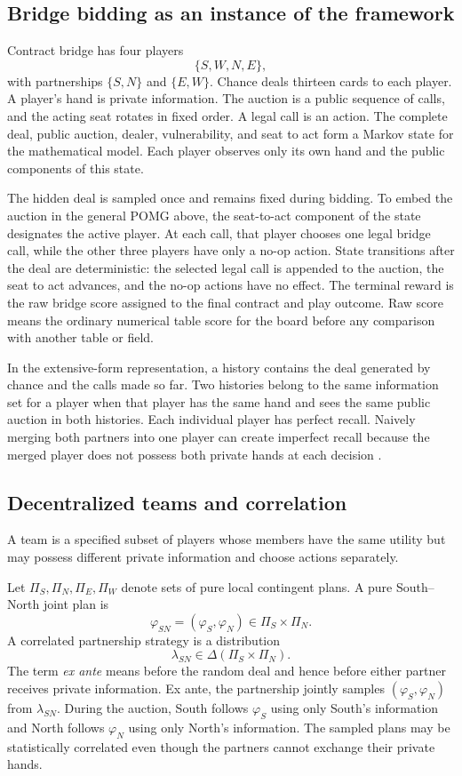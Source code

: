 \subsection{Bridge bidding as an instance of the framework}

Contract bridge has four players
\[
    \{S,W,N,E\},
\]
with partnerships $\{S,N\}$ and $\{E,W\}$. Chance deals thirteen cards to each player. A player's hand is private information. The auction is a public sequence of calls, and the acting seat rotates in fixed order. A legal call is an action. The complete deal, public auction, dealer, vulnerability, and seat to act form a Markov state for the mathematical model. Each player observes only its own hand and the public components of this state.

The hidden deal is sampled once and remains fixed during bidding. To embed the auction in the general POMG above, the seat-to-act component of the state designates the active player. At each call, that player chooses one legal bridge call, while the other three players have only a no-op action. State transitions after the deal are deterministic: the selected legal call is appended to the auction, the seat to act advances, and the no-op actions have no effect. The terminal reward is the raw bridge score assigned to the final contract and play outcome. Raw score means the ordinary numerical table score for the board before any comparison with another table or field.

In the extensive-form representation, a history contains the deal generated by chance and the calls made so far. Two histories belong to the same information set for a player when that player has the same hand and sees the same public auction in both histories. Each individual player has perfect recall. Naively merging both partners into one player can create imperfect recall because the merged player does not possess both private hands at each decision \cite{gimbert2020bridge}.


\subsection{Decentralized teams and correlation}
\label{app:decentralized-teams}

A team is a specified subset of players whose members have the same utility but may possess different private information and choose actions separately.

Let $\Pi_S,\Pi_N,\Pi_E,\Pi_W$ denote sets of pure local contingent plans. A pure South--North joint plan is
\[
    \varphi_{SN}=(\varphi_S,\varphi_N)\in\Pi_S\times\Pi_N.
\]
A correlated partnership strategy is a distribution
\[
    \lambda_{SN}\in\Delta(\Pi_S\times\Pi_N).
\]
The term \emph{ex ante} means before the random deal and hence before either partner receives private information. Ex ante, the partnership jointly samples $(\varphi_S,\varphi_N)$ from $\lambda_{SN}$. During the auction, South follows $\varphi_S$ using only South's information and North follows $\varphi_N$ using only North's information. The sampled plans may be statistically correlated even though the partners cannot exchange their private hands.

